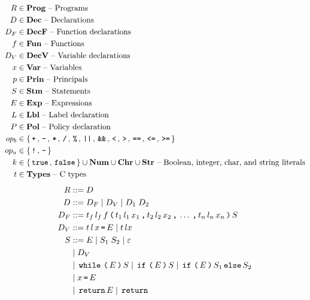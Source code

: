 \begin{table}[h]
  \begin{align*}
    R       & \in \mathbf{Prog} \text{ -- Programs}\\
    D       & \in \mathbf{Dec} \text{ -- Declarations}\\
    D_F     & \in \mathbf{DecF} \text{ -- Function declarations}\\
    f       & \in \mathbf{Fun} \text{ -- Functions}\\
    D_V     & \in \mathbf{DecV} \text{ -- Variable declarations}\\
    x       & \in \mathbf{Var} \text{ -- Variables}\\
    p       & \in \mathbf{Prin} \text{ -- Principals}\\
    S       & \in \mathbf{Stm} \text{ -- Statements}\\
    E       & \in \mathbf{Exp} \text{ -- Expressions}\\
    L       & \in \mathbf{Lbl} \text{ -- Label declaration}\\
    P       & \in \mathbf{Pol} \text{ -- Policy declaration}\\
    op_b    & \in \{ \, \texttt{+} \, ,  \, \texttt{-} \, ,  \, \texttt{*} \, ,  \, \texttt{/} \, ,  \, \texttt{\%} \, ,  \, \texttt{||} \, ,  \, \texttt{\&\&} \, ,  \, \texttt{<} \, ,  \, \texttt{>} \, ,  \, \texttt{==} \, ,  \, \texttt{<=} \, ,  \, \texttt{>=} \, \} \\
    op_u    & \in \{ \, \texttt{!} \, ,  \, \texttt{-} \, \} \\
    k       & \in \{ \, \texttt{true} \,, \, \texttt{false} \, \} \cup \mathbf{Num} \cup \mathbf{Chr} \cup \mathbf{Str} \text{ -- Boolean, integer, char, and string literals} \\
    t       & \in \mathbf{Types} \text{ -- C types}
  \end{align*}
  \begin{align*}
    R         & ::= D \\
    D         & ::= D_F \gp D_V \gp D_1 \; D_2 \\
    D_F       & ::= t_f \, l_f \, f \tk ( t_1 \, l_1 \, x_1 \tk , t_2 \, l_2 \, x_2 \tk , \dots \tk , t_n \, l_n \, x_n \tk ) S \\
    D_V       & ::= t \, l \, x \tk = E \gp t \, l x \\
    S         & ::= E \gp S_1 \; S_2 \gp \varepsilon \\
              & \gp D_V \\
              & \gp \tk{while} \tk ( E \tk ) S \gp \tk{if} \tk ( E \tk ) S \gp \tk{if} \tk ( E \tk ) S_1 \tk{else} S_2 \\
              & \gp x \tk = E \\
              & \gp \tk{return} E \gp \tk{return} \\

\end{align*}
\end{table}
